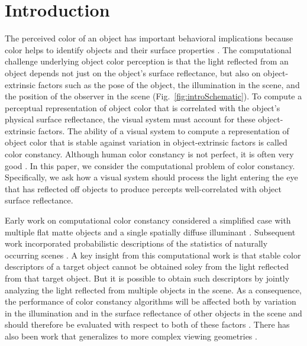 \documentclass{jov}
\begin{document}

\maketitle

\section{Introduction}
The perceived color of an object has important behavioral implications because color helps to identify objects and their surface properties \cite{Mollon89, Jacobs81}.
The computational challenge underlying object color perception is that the light reflected from an object depends not just on the object's surface reflectance, but also 
on object-extrinsic factors such as the pose of the object, the illumination in the scene, and the position of the observer in the scene (Fig.~\ref{fig:introSchematic}).
To compute a perceptual representation of object color that is correlated with the object's physical surface reflectance, the visual system must account for these object-extrinsic factors.
The ability of a visual system to compute a representation of object color that is stable against variation in object-extrinsic factors is called color constancy. 
Although human color constancy is not perfect, it is often very good \cite{FosterColorConstancy, BrainardColorConstancy}. 
In this paper, we consider the computational problem of color constancy.
Specifically, we ask how a visual system should process the light entering the eye that has reflected off objects to produce percepts well-correlated with object surface reflectance.

Early work on computational color constancy considered a simplified case with multiple flat matte objects and a single spatially diffuse illuminant \cite{LandRetinex,Buchsbaum80,MaloneyWandell86}.
Subsequent work incorporated probabilistic descriptions of the statistics of naturally occurring scenes \cite{D'ZmuraConstancy3, D'ZmuraIversonSinger,BrainardFreeman}.
A key insight from this computational work is that stable color descriptors of a target object cannot be obtained soley from the light reflected from that target object.
But it is possible to obtain such descriptors by jointly analyzing the light reflected from multiple objects in the scene.
As a consequence, the performance of color constancy algorithms will be affected both by variation in the illumination and in the surface reflectance of other objects in the scene and should therefore be evaluated with respect to both of these factors \cite{BrainardWandellRetinex,BrainardFreeman}. 
There has also been work that generalizes to more complex viewing geometries \cite{funt1988color, barron2012color}.
\end{document}
